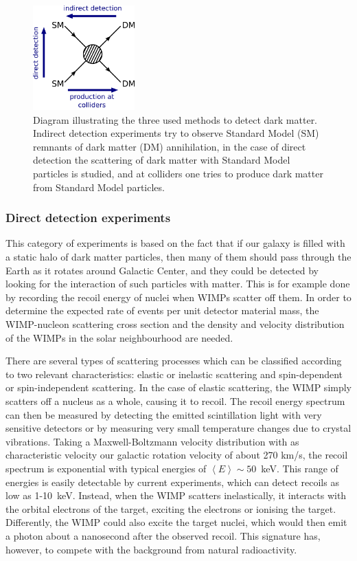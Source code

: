 \begin{figure}[ht]
  \centering
  \includegraphics[width=0.35\textwidth]{DM_production.pdf}\hfill%
  \caption{Diagram illustrating the three used methods to detect dark matter. Indirect detection experiments try to observe Standard Model (SM) remnants of dark matter (DM) annihilation, in the case of direct detection the scattering of dark matter with Standard Model particles is studied, and at colliders one tries to produce dark matter from Standard Model particles.}
  \label{fig:DM_production}
\end{figure}

\subsubsection{Direct detection experiments}

This category of experiments is based on the fact that if our galaxy is filled with a static halo of dark matter particles, then many of them should pass through the Earth as it rotates around Galactic Center, and they could be detected by looking for the interaction of such particles with matter. This is for example done by recording the recoil energy of nuclei when \acp{WIMP} scatter off them. In order to determine the expected rate of events per unit detector material mass, the \ac{WIMP}-nucleon scattering cross section and the density and velocity distribution of the \acp{WIMP} in the solar neighbourhood are needed.

There are several types of scattering processes which can be classified according to two relevant characteristics: elastic or inelastic scattering and spin-dependent or spin-independent scattering. In the case of elastic scattering, the \ac{WIMP} simply scatters off a nucleus as a whole, causing it to recoil. The recoil energy spectrum can then be measured by detecting the emitted scintillation light with very sensitive detectors or by measuring very small temperature changes due to crystal vibrations. Taking a Maxwell-Boltzmann velocity distribution with as characteristic velocity our galactic rotation velocity of about 270 km/s, the recoil spectrum is exponential with typical energies of $\left\langle E \right\rangle \sim 50$~keV. This range of energies is easily detectable by current experiments, which can detect recoils as low as 1-10~keV. Instead, when the \ac{WIMP} scatters inelastically, it interacts with the orbital electrons of the target, exciting the electrons or ionising the target. Differently, the \ac{WIMP} could also excite the target nuclei, which would then emit a photon about a nanosecond after the observed recoil. This signature has, however, to compete with the background from natural radioactivity.

